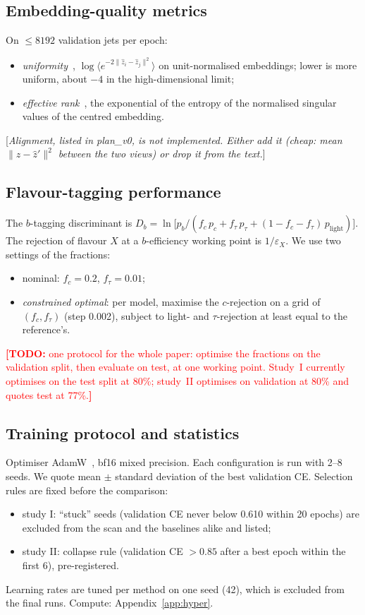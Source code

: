 \documentclass[11pt,a4paper]{article}
\newcommand{\todo}[1]{\textcolor{red}{\textbf{[TODO:} #1\textbf{]}}}
\newcommand{\note}[1]{\textcolor{blue!70!black}{[\emph{#1}]}}
\begin{document}
\subsection{Embedding-quality metrics}
On $\le 8192$ validation jets per epoch:
\begin{itemize}
  \item \emph{uniformity}~\citep{Wang2020AlignmentUniformity},
        $\log\langle e^{-2\|\hat z_i-\hat z_j\|^2}\rangle$ on unit-normalised embeddings;
        lower is more uniform, about $-4$ in the high-dimensional limit;
  \item \emph{effective rank}~\citep{Roy2007EffectiveRank}, the exponential of the entropy
        of the normalised singular values of the centred embedding.
\end{itemize}
\note{Alignment, listed in plan\_v0, is not implemented. Either add it (cheap: mean
$\|\hat z-\hat z'\|^2$ between the two views) or drop it from the text.}

\subsection{Flavour-tagging performance}
The $b$-tagging discriminant is
$D_b=\ln\!\big[p_b/(f_c\,p_c+f_\tau\,p_\tau+(1-f_c-f_\tau)\,p_{\mathrm{light}})\big]$.
The rejection of flavour $X$ at a $b$-efficiency working point is $1/\varepsilon_X$. We use
two settings of the fractions:
\begin{itemize}
  \item nominal: $f_c=0.2$, $f_\tau=0.01$;
  \item \emph{constrained optimal}: per model, maximise the $c$-rejection on a grid of
        $(f_c,f_\tau)$ (step 0.002), subject to light- and $\tau$-rejection at least equal
        to the reference's.
\end{itemize}
\todo{one protocol for the whole paper: optimise the fractions on the validation split, then
evaluate on test, at one working point. Study~I currently optimises on the test split at
80\%; study~II optimises on validation at 80\% and quotes test at 77\%.}

\subsection{Training protocol and statistics}
Optimiser AdamW~\citep{Loshchilov2019AdamW}, bf16 mixed precision. Each configuration is
run with 2--8 seeds. We quote mean $\pm$ standard deviation of the best validation CE.
Selection rules are fixed before the comparison:
\begin{itemize}
  \item study I: ``stuck'' seeds (validation CE never below 0.610 within 20 epochs) are
        excluded from the scan and the baselines alike and listed;
  \item study II: collapse rule (validation CE $>0.85$ after a best epoch within the first
        6), pre-registered.
\end{itemize}
Learning rates are tuned per method on one seed (42), which is excluded from the final runs.
Compute: Appendix~\ref{app:hyper}.
\end{document}
